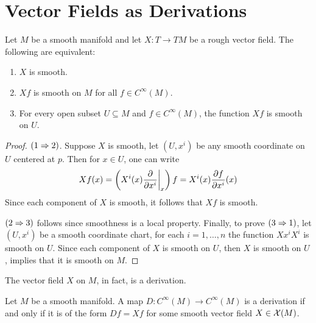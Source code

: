 \section{Vector Fields as Derivations}
\begin{proposition}
    Let $M$ be a smooth manifold and let $X: T \to TM$ be a rough vector field. The following are equivalent:
    \begin{enumerate}
        \item $X$ is smooth.
        \item $Xf$ is smooth on $M$ for all $f \in C^\infty(M)$.
        \item For every open subset $U \subseteq M$ and $f  \in C^\infty(M)$, the function $Xf$ is smooth on $U$.
    \end{enumerate}
\end{proposition}
\begin{proof}
    $(1 \Rightarrow 2)$. Suppose $X$ is smooth, let $(U,x^i)$ be any smooth coordinate on $U$ centered at $p$. Then for $x \in U$, one can write
    \[
        Xf(x) = \left(X^i(x)\frac{\partial}{\partial x^i}\bigg|_x\right)f = X^i(x)\frac{\partial f}{\partial x^i}(x)
    \]
    Since each component of $X$ is smooth, it follows that $Xf$ is smooth.

    $(2 \Rightarrow 3)$ follows since smoothness is a local property. Finally, to prove $(3 \Rightarrow 1)$, let $(U,x^i)$ be a smooth coordinate chart, for each $i = 1,\dots, n$ the function $X x^i X^i$ is smooth on $U$. Since each component of $X$ is smooth on $U$, then $X$ is smooth on $U$, implies that it is smooth on $M$.
    
\end{proof}
\begin{proposition}
    The vector field $X$ on $M$, in fact, is a derivation.
\end{proposition}
\begin{proposition}
    Let $M$ be a smooth manifold. A map $D: C^\infty(M) \to C^\infty(M)$ is a derivation if and only if it is of the form $Df = Xf$ for some smooth vector field $X \in \mathcal{X}(M)$.
\end{proposition}
